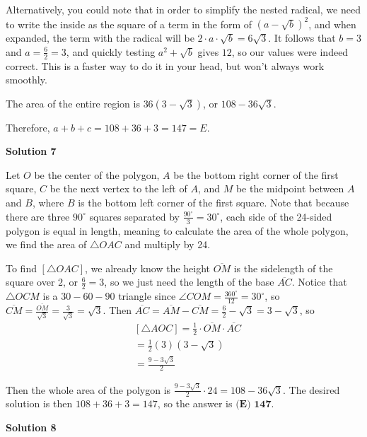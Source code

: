 \begin{enumerate}
 Alternatively, you could note that in order to simplify the nested radical, we need to write the inside as the square of a term in the form of $(a-\sqrt{b})^2$, and when expanded, the term with the radical will be $2\cdot a \cdot \sqrt{b} = 6\sqrt{3}$. It follows that $b=3$ and $a=\frac{6}{2} = 3$, and quickly testing $a^2+\sqrt{b}$ gives $12$, so our values were indeed correct. This is a faster way to do it in your head, but won't always work smoothly.

 
The area of the entire region is $36(3 - \sqrt{3})$, or $108 - 36\sqrt{3}$.  

 Therefore, $a + b + c = 108 + 36+ 3 = 147 = \boxed{E}$.

 



\textbf{Solution 7}

Let $O$ be the center of the polygon, $A$ be the bottom right corner of the first square, $C$ be the next vertex to the left of $A$, and $M$ be the midpoint between $A$ and $B$, where $B$ is the bottom left corner of the first square. Note that because there are three $90^{\circ}$ squares separated by $\frac{90^{\circ}}{3} = 30^{\circ}$, each side of the 24-sided polygon is equal in length, meaning to calculate the area of the whole polygon, we find the area of $\bigtriangleup OAC$ and multiply by 24.

 
To find $[\bigtriangleup OAC]$, we already know the height $\overline{OM}$ is the sidelength of the square over $2$, or $\frac{6}{2}=3$, so we just need the length of the base $\overline{AC}$. Notice that $\bigtriangleup OCM$ is a $30-60-90$ triangle since $\angle COM = \frac{360^{\circ}}{12} = 30^{\circ}$, so $\overline{CM} = \frac{\overline{OM}}{\sqrt{3}} = \frac{3}{\sqrt{3}} = \sqrt{3}$. Then $\overline{AC} = \overline{AM} - \overline{CM} = \frac{6}{2} - \sqrt{3} = 3 - \sqrt{3}$, so 
 \begin{align*} & [\bigtriangleup AOC] = \frac{1}{2} \cdot \overline{OM} \cdot \overline{AC} \\ & = \frac{1}{2} (3)(3 - \sqrt{3}) \\ & = \frac{9 - 3\sqrt{3}}{2} \end{align*}


 Then the whole area of the polygon is $\frac{9 - 3\sqrt{3}}{2} \cdot 24 = 108 - 36\sqrt{3}$. The desired solution is then $108 + 36 + 3 = 147$, so the answer is $\boxed{\textbf{(E) 147}}$.

 



\textbf{Solution 8}


\end{enumerate}
